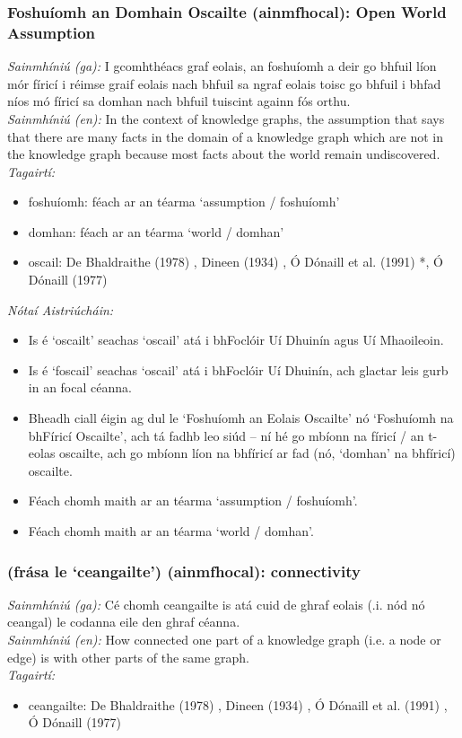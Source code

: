 \subsubsection*{Foshuíomh an Domhain Oscailte (ainmfhocal): Open World Assumption}
 \noindent \textit{Sainmhíniú (ga):} I gcomhthéacs graf eolais, an foshuíomh a deir go bhfuil líon mór fíricí i réimse graif eolais nach bhfuil sa ngraf eolais toisc go bhfuil i bhfad níos mó fíricí sa domhan nach bhfuil tuiscint againn fós orthu.
\\
 \noindent \textit{Sainmhíniú (en):} In the context of knowledge graphs, the assumption that says that there are many facts in the domain of a knowledge graph which are not in the knowledge graph because most facts about the world remain undiscovered.
\\
 \noindent \textit{Tagairtí:}
\begin{itemize}
	\item foshuíomh: féach ar an téarma `assumption / foshuíomh'
	\item domhan: féach ar an téarma `world / domhan'
	\item oscail: De Bhaldraithe (1978) \cite{de-bhaldraithe}, Dineen (1934) \cite{dineen}, Ó Dónaill et al. (1991) \cite{focloir-beag}*, Ó Dónaill (1977) \cite{odonaill}
\end{itemize}

 \noindent \textit{Nótaí Aistriúcháin:}
\begin{itemize}
	\item Is é `oscailt' seachas `oscail' atá i bhFoclóir Uí Dhuinín agus Uí Mhaoileoin.
	\item Is é `foscail' seachas `oscail' atá i bhFoclóir Uí Dhuinín, ach glactar leis gurb in an focal céanna.
	\item Bheadh ciall éigin ag dul le `Foshuíomh an Eolais Oscailte' nó `Foshuíomh na bhFíricí Oscailte', ach tá fadhb leo siúd -- ní hé go mbíonn na fíricí / an t-eolas oscailte, ach go mbíonn líon na bhfíricí ar fad (nó, `domhan' na bhfíricí) oscailte.
	\item Féach chomh maith ar an téarma `assumption / foshuíomh'.
	\item Féach chomh maith ar an téarma `world / domhan'.
\end{itemize}


\subsubsection*{(frása le `ceangailte') (ainmfhocal): connectivity}
 \noindent \textit{Sainmhíniú (ga):} Cé chomh ceangailte is atá cuid de ghraf eolais (.i. nód nó ceangal) le codanna eile den ghraf céanna.
\\
 \noindent \textit{Sainmhíniú (en):} How connected one part of a knowledge graph (i.e. a node or edge) is with other parts of the same graph.
\\
 \noindent \textit{Tagairtí:}
\begin{itemize}
	\item ceangailte: De Bhaldraithe (1978) \cite{de-bhaldraithe}, Dineen (1934) \cite{dineen}, Ó Dónaill et al. (1991) \cite{focloir-beag}, Ó Dónaill (1977) \cite{odonaill}
\end{itemize}

